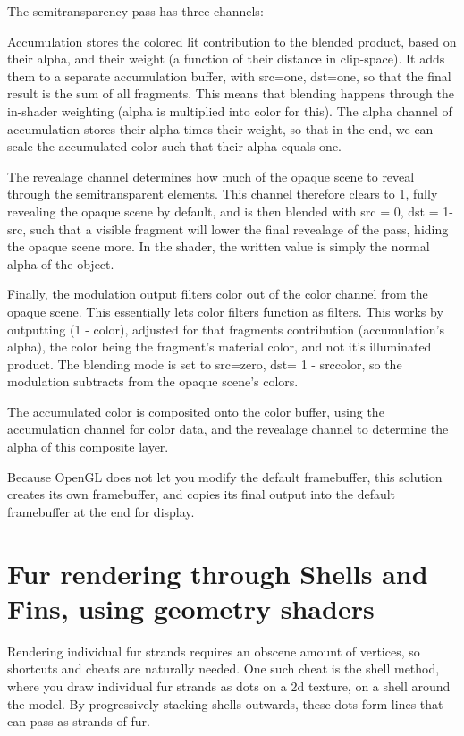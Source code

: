 \documentclass[a4paper, 12pt]{article}
\begin{document}
    The semitransparency pass has three channels:

    Accumulation stores the colored lit contribution to the blended product,
    based on their alpha, and their weight (a function of their distance in clip-space).
    It adds them to a separate accumulation buffer, with src=one, dst=one,
    so that the final result is the sum of all fragments.
    This means that blending happens through the in-shader weighting (alpha is multiplied into color for this).
    The alpha channel of accumulation stores their alpha times their weight,
    so that in the end, we can scale the accumulated color such that their alpha equals one.

    The revealage channel determines how much of the opaque scene
    to reveal through the semitransparent elements.
    This channel therefore clears to 1, fully revealing the opaque scene by default,
    and is then blended with src = 0, dst = 1-src,
    such that a visible fragment
    will lower the final revealage of the pass,
    hiding the opaque scene more.
    In the shader, the written value is simply the normal alpha of the object.

    Finally, the modulation output filters color out of the color channel from the opaque scene.
    This essentially lets color filters function as filters.
    This works by outputting (1 - color), adjusted for that fragments contribution (accumulation's alpha),
    the color being the fragment's material color, and not it's illuminated product.
    The blending mode is set to src=zero, dst= 1 - srccolor,
    so the modulation subtracts from the opaque scene's colors.

    The accumulated color is composited onto the color buffer,
    using the accumulation channel for color data,
    and the revealage channel to determine the alpha of this composite layer.

    Because OpenGL does not let you modify the default framebuffer,
    this solution creates its own framebuffer,
    and copies its final output into the default framebuffer at the end for display.

    \section{Fur rendering through Shells and Fins, using geometry shaders}

    Rendering individual fur strands requires an obscene amount of vertices,
    so shortcuts and cheats are naturally needed.
    One such cheat is the shell method,
    where you draw individual fur strands as dots on a 2d texture,
    on a shell around the model.
    By progressively stacking shells outwards,
    these dots form lines that can pass as strands of fur.
\end{document}
